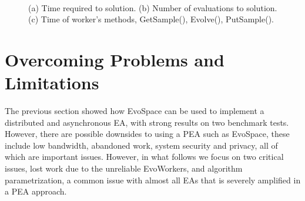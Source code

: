 \begin{figure}[t]
    \centering
    \\
    \caption{
    (a) Time required to solution.
    (b) Number of evaluations to solution. (c) Time of worker's methods, GetSample(), Evolve(), PutSample().}
    \label{fig:effort_real_time}
\end{figure}




\section{Overcoming Problems and Limitations}
\label{sec:overcome}
The previous section showed how EvoSpace can be used to implement a distributed and asynchronous EA, with strong results on two benchmark tests.
However, there are possible downsides to using a PEA such as EvoSpace, these include low bandwidth, abandoned work, system security and privacy, all of which are important issues. However, in what follows we focus on two critical issues, lost work due to the unreliable EvoWorkers,
and algorithm parametrization, a common issue with almost all EAs that is severely amplified in a PEA approach.

